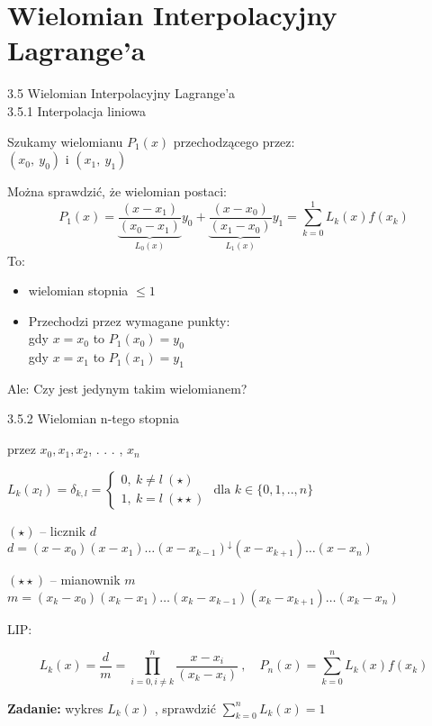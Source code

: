 \section{Wielomian Interpolacyjny Lagrange'a}

\begin{frame}{3.5 Wielomian Interpolacyjny Lagrange'a \\ 3.5.1 Interpolacja liniowa}

Szukamy wielomianu $P_{1}(x)$ przechodzącego  przez:\\
$(x_{0},\ y_{0})$ i $(x_{1},\ y_{1})$

Można sprawdzić, że wielomian postaci:
$$
P_{1}(x)=\underbrace{\frac{(x-x_{1})}{(x_{0}-x_{1})}}_{L_0(x)}y_{0}+\underbrace{\frac{(x-x_{0})}{(x_{1}-x_{0})}}_{L_1(x)}y_{1}=\sum_{k=0}^{1}L_{k}(x)f(x_{k})
$$
To:
\begin{itemize}
\item wielomian stopnia $\leq 1$

\item Przechodzi przez wymagane punkty:\\
gdy $x=x_{0}$ to $ P_1(x_{0})=y_{0}$ \\
gdy $x=x_{1}$ to $P_1(x_{1})=y_{1}$ \\
\end{itemize}
\begin{flushright}Ale: Czy jest jedynym takim wielomianem?\end{flushright}

\end{frame}


\begin{frame}{3.5.2 Wielomian $\mathrm{n}$-tego stopnia}


przez $x_{0}, x_{1}, x_{2}$, . . . , $x_{n}$

$L_{k}(x_{l})=\delta_{k,l}=\left\{\begin{array}{l}
0,\ k\neq l\ (\star)\ \\
1,\ k=l\ (\star\star)
\end{array}\right. \text{ dla $k \in \{0,1,..,n\} $} $

$(\star)$ -- licznik $d$
$d=(x-x_{0})(x-x_{1})\ldots(x-x_{k-1})^{\downarrow}(x-x_{k+1})\ldots(x-x_{n})$

$(\star\star)$ -- mianownik $m$
$m=(x_{k}-x_{0})(x_{k}-x_{1})\ldots(x_{k}-x_{k-1})(x_{k}-x_{k+1})\ldots(x_{k}-x_{n})$

LIP:

$$L_{k}(x) = \frac{d}{m} = \prod_{i=0,i\neq k}^{n}\frac{x-x_{i}}{(x_{k}-x_{i})}\ , \quad P_{n}(x)=\sum_{k=0}^{n}L_{k}(x)f(x_{k})$$

\textbf{Zadanie:} wykres $L_{k}(x)$ , sprawdzić $\displaystyle \sum_{k=0}^{n}L_{k}(x)=1$
\end{frame}


